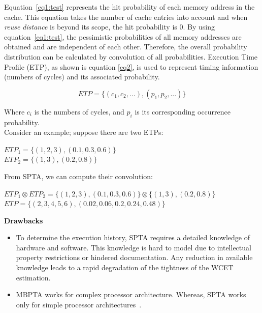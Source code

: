 
Equation~\eqref{eq1:test} represents the hit probability of each memory address in
the cache. This equation takes the number of cache entries into account and when
\textit{reuse distance} is beyond its scope, the hit probability is 0. By using
equation~\eqref{eq1:test}, the pessimistic probabilities of all memory addresses are
obtained and are independent of each other. Therefore, the overall
probability distribution can be calculated by convolution of all probabilities. Execution Time Profile (ETP), as shown is equation \eqref{eq2}, is used to represent timing information (numbers of cycles) and its
associated probability. 


\begin{equation}\label{eq2}
ETP = \{(c_1, c_2, ...), (p_1, p_2, ...)\} 
\end{equation}

Where $c_i$ is the numbers of cycles, and $p_i$ is its corresponding occurrence
probability.
\\
Consider an example; suppose there are two ETPs: 
\begin{center}


$ETP_1 = \{(1, 2, 3), (0.1, 0.3, 0.6)\}$ \\
$ETP_2 = \{(1, 3), (0.2, 0.8)\}$
\end{center}

From SPTA, we can compute their convolution: 
\begin{center}
$ETP_1 \otimes  ETP_2 = \{(1, 2, 3), (0.1, 0.3, 0.6)\} \otimes \{(1, 3), (0.2, 0.8)\}$ \\
$ETP = \{(2, 3, 4, 5, 6), (0.02, 0.06, 0.2, 0.24, 0.48)\}$
\end{center}

\textbf{Drawbacks}
\begin{itemize}
\item To determine the execution history, SPTA requires a detailed knowledge of hardware and software. This knowledge is hard to model due to intellectual property restrictions or hindered documentation. Any reduction in available knowledge leads to a rapid degradation of the tightness of the WCET estimation. 
\item MBPTA works for complex processor architecture. Whereas, SPTA works only for simple processor architectures~\cite{abella2014comparison}.
\end{itemize}



